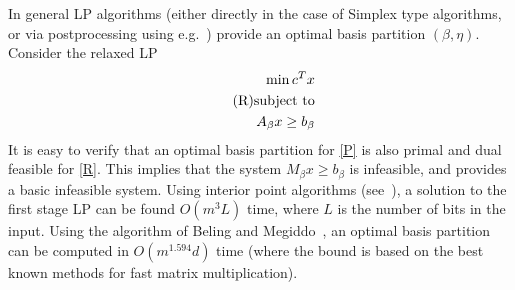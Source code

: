 \documentclass[charterfonts,lotsofwhite]{patmorin}
\begin{document}
In general LP algorithms (either directly in the case of Simplex type
algorithms, or via postprocessing using
e.g.~\cite{megiddo91,vavasis96,BelingMegiddo98}) provide an optimal
basis partition $(\beta,\eta)$.  Consider the relaxed LP
\begin{align*}
  \min c^T x \\\tag{R}
  \eqlabel{R}
  \text{subject to}\\
  A_\beta x \geq b_\beta
\end{align*}
It is easy to verify that an optimal basis partition for \eqref{P}
is also primal and dual feasible for \eqref{R}.  This implies that
the system $M_\beta x \geq b_\beta$ is infeasible, and provides a
basic infeasible system.  Using interior point algorithms
(see~\cite{gonzaga87,renegar88,vaidya90,Roos89,RoosVial92}), a
solution to the first stage LP can be found $O(m^3L)$ time, where $L$
is the number of bits in the input.  Using the algorithm of Beling and
Megiddo~\cite{BelingMegiddo98}, an optimal basis partition can be
computed in $O(m^{1.594}d)$ time (where the bound is based on the best
known methods for fast matrix multiplication).
\end{document}

